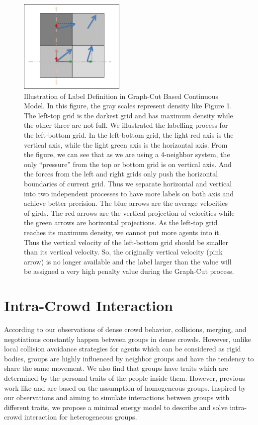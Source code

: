 \documentclass[conference]{acmsiggraph}
\begin{document}
\begin{figure}
  \centering
  \includegraphics[width=2.0in]{images/graph_cut_model}
  \caption{Illustration of Label Definition in Graph-Cut Based Continuous Model. In this figure, the gray scales represent density like Figure 1. The left-top grid is the darkest grid and has maximum density while the other three are not full. We illustrated the labelling process for the left-bottom grid. In the left-bottom grid, the light red axis is the vertical axis, while the light green axis is the horizontal axis. From the figure, we can see that as we are using a 4-neighbor system, the only “pressure” from the top or bottom grid is on vertical axis. And the forces from the left and right grids only push the horizontal boundaries of current grid. Thus we separate horizontal and vertical into two independent processes to have more labels on both axis and achieve better precision. The blue arrows are the average velocities of girds. The red arrows are the vertical projection of velocities while the green arrows are horizontal projections. As the left-top grid reaches its maximum density, we cannot put more agents into it. Thus the vertical velocity of the left-bottom grid should be smaller than its vertical velocity. So, the originally vertical velocity (pink arrow) is no longer available and the label larger than the value will be assigned a very high penalty value during the Graph-Cut process.}
  \label{figure:graphcutmodel}
\end{figure}

\section{Intra-Crowd Interaction}
\label{section:4}
According to our observations of dense crowd behavior, collisions, merging, and negotiations constantly happen between groups in dense crowds. However, unlike local collision avoidance strategies for agents which can be considered as rigid bodies, groups are highly influenced by neighbor groups and have the tendency to share the same movement. We also find that groups have traits which are determined by the personal traits of the people inside them. However, previous work like \cite{Treuille:2006} and \cite{Narain:2009} are based on the assumption of homogeneous groups. Inspired by our observations and aiming to simulate interactions between groups with different traits, we propose a minimal energy model to describe and solve intra-crowd interaction for heterogeneous groups.
\end{document}
